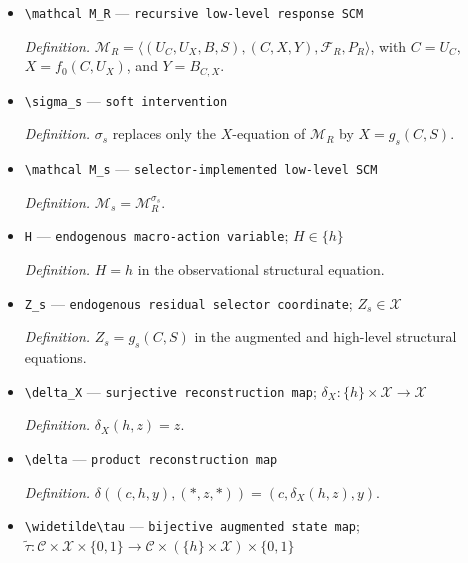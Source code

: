 \documentclass{article}
\begin{document}
\begin{itemize}
  \par\smallskip\noindent\emph{Definition.} \(P_R\) is the joint law of \(U_C,U_X,B,S\), shared by every selector construction.
  \item \texttt{\textbackslash{}\allowbreak{}mathcal M\_\allowbreak{}R} --- \texttt{recursive low-\allowbreak{}level response SCM}
  \par\smallskip\noindent\emph{Definition.} \(\mathcal M_R=\langle(U_C,U_X,B,S),(C,X,Y),\mathcal F_R,P_R\rangle\), with \(C=U_C\), \(X=f_0(C,U_X)\), and \(Y=B_{C,X}\).
  \item \texttt{\textbackslash{}\allowbreak{}sigma\_\allowbreak{}s} --- \texttt{soft intervention}
  \par\smallskip\noindent\emph{Definition.} \(\sigma_s\) replaces only the \(X\)-equation of \(\mathcal M_R\) by \(X=g_s(C,S)\).
  \item \texttt{\textbackslash{}\allowbreak{}mathcal M\_\allowbreak{}s} --- \texttt{selector-\allowbreak{}implemented low-\allowbreak{}level SCM}
  \par\smallskip\noindent\emph{Definition.} \(\mathcal M_s=\mathcal M_R^{\sigma_s}\).
  \item \texttt{H} --- \texttt{endogenous macro-\allowbreak{}action variable}; \(H\in\{h\}\)
  \par\smallskip\noindent\emph{Definition.} \(H=h\) in the observational structural equation.
  \item \texttt{Z\_\allowbreak{}s} --- \texttt{endogenous residual selector coordinate}; \(Z_s\in\mathcal X\)
  \par\smallskip\noindent\emph{Definition.} \(Z_s=g_s(C,S)\) in the augmented and high-level structural equations.
  \item \texttt{\textbackslash{}\allowbreak{}delta\_\allowbreak{}X} --- \texttt{surjective reconstruction map}; \(\delta_X:\{h\}\times\mathcal X\to\mathcal X\)
  \par\smallskip\noindent\emph{Definition.} \(\delta_X(h,z)=z\).
  \item \texttt{\textbackslash{}\allowbreak{}delta} --- \texttt{product reconstruction map}
  \par\smallskip\noindent\emph{Definition.} \(\delta((c,h,y),(\ast,z,\ast))=(c,\delta_X(h,z),y)\).
  \item \texttt{\textbackslash{}\allowbreak{}widetilde\textbackslash{}\allowbreak{}tau} --- \texttt{bijective augmented state map}; \(\widetilde\tau:\mathcal C\times\mathcal X\times\{0,1\}\to\mathcal C\times(\{h\}\times\mathcal X)\times\{0,1\}\)

\end{itemize}
\end{document}
